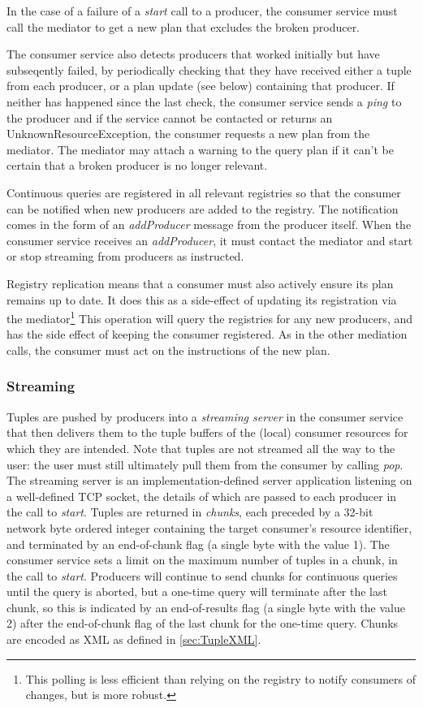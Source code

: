 In the case of a failure of a \textit{start} call to a producer, the consumer
service must call the mediator to get a new plan that excludes the
broken producer.

The consumer service also detects producers that worked initially but have
subseqently failed, by periodically checking that they have received either
a tuple from each producer, or a plan update (see below) containing that
producer. If neither has happened since the last check, the consumer service
sends a \textit{ping} to the producer and if the service cannot be contacted
or returns an UnknownResourceException, the consumer requests a new plan from
the mediator. The mediator may attach a warning to the query plan if it can't be
certain that a broken producer is no longer relevant.

Continuous queries are registered in all relevant registries so that the consumer can be
notified when new producers are added to the registry. The notification comes
in the form of an \textit{addProducer} message from the producer itself. When
the consumer service receives an \textit{addProducer}, it must contact the
mediator and start or stop streaming from producers as instructed.

Registry replication means that a consumer must also actively ensure its plan
remains up to date. It does this as a side-effect of updating its registration
via the mediator\footnote{This polling is less efficient than
relying on the registry to notify consumers of changes, but is more robust.}
This operation will query the registries for any new producers, and has the side
effect of keeping the consumer registered. As in the other mediation calls, the
consumer must act on the instructions of the new plan.

\subsubsection{Streaming}\label{sec:ConsumerStreaming}

Tuples are pushed by producers into a \textit{streaming
server} in the consumer service that then
delivers them to the tuple buffers of the (local) consumer resources
for which they are intended. Note that tuples are not streamed all the
way to the user: the user must still ultimately pull them from the
consumer by calling \textit{pop}. The streaming server is an
implementation-defined server application listening on a well-defined
TCP socket, the details of which are passed to each producer in the
call to \textit{start}. Tuples are returned in
\textit{chunks}, each preceded by a 32-bit network byte
ordered integer containing the target consumer's resource identifier,
and terminated by an end-of-chunk flag (a single byte with the value
1). The consumer service sets a limit on the maximum number of tuples
in a chunk, in the call to \textit{start}.  Producers will continue to
send chunks for continuous queries until the query is aborted, but a
one-time query will terminate after the last chunk, so this is
indicated by an end-of-results flag (a single byte with the value 2)
after the end-of-chunk flag of the last chunk for the one-time
query. Chunks are encoded as XML as defined in
\ref{sec:TupleXML}.

